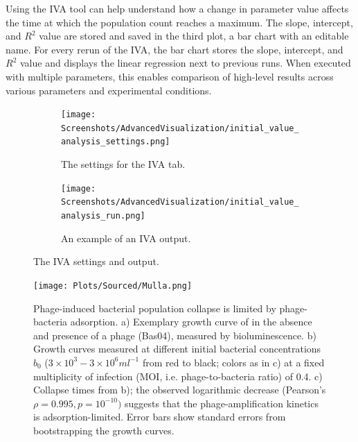 Using the IVA tool can help understand how a change in parameter value affects the time at which the population count reaches a maximum.
The slope, intercept, and $R^2$ value are stored and saved in the third plot, a bar chart with an editable name. 
For every rerun of the IVA, the bar chart stores the slope, intercept, and $R^2$ value and displays the linear regression next to previous runs. 
When executed with multiple parameters, this enables comparison of high-level results across various parameters and experimental conditions.

\begin{figure}[h!]
    \centering
    \begin{subfigure}{0.49\linewidth}
        \centering
        \captionsetup{width=1\linewidth}
        \texttt{[image: Screenshots/AdvancedVisualization/initial\_value\_analysis\_settings.png]}
        \caption{
            The settings for the IVA tab. 
        }
        \label{fig:ss:av:initial_value_analysis_settings}
        \vspace*{\fill}
    \end{subfigure}
    \hfill
    \begin{subfigure}{0.49\linewidth}
        \centering
        \captionsetup{width=1\linewidth}
        \texttt{[image: Screenshots/AdvancedVisualization/initial\_value\_analysis\_run.png]}
        \caption{
            An example of an IVA output. 
        }
        \label{fig:ss:av:initial_value_analysis_run}
        \vspace*{\fill}
    \end{subfigure}
    \caption{The IVA settings and output. }
\end{figure}

\begin{figure}[]
    \texttt{[image: Plots/Sourced/Mulla.png]}
    \centering
    \caption{
        Phage-induced bacterial population collapse is limited by phage-bacteria adsorption. 
        a) Exemplary growth curve of  in the absence and presence of a phage (Bas04), measured by bioluminescence. 
        b) Growth curves measured at different initial bacterial concentrations $b_0$ ($3\times10^3 - 3\times 10^6 ml^{-1}$ from red to black; colors as in c) at a fixed multiplicity of infection (MOI, i.e. phage-to-bacteria ratio) of 0.4. 
        c) Collapse times from b); the observed logarithmic decrease (Pearson's $\rho=0.995, p=10^{-10})$ suggests that the phage-amplification kinetics is adsorption-limited. 
        Error bars show standard errors from bootstrapping the growth curves.
    }
    \label{fig:sourced:Mulla}
\end{figure}

